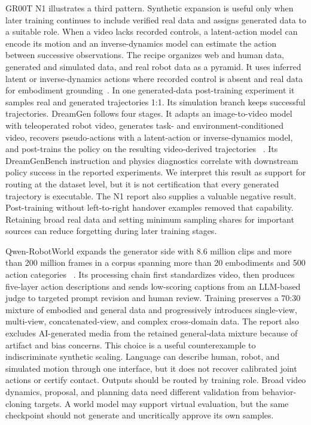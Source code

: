 GR00T N1 illustrates a third pattern.
Synthetic expansion is useful only when later training continues to include verified real data and assigns generated data to a suitable role.
When a video lacks recorded controls, a latent-action model can encode its motion and an inverse-dynamics model can estimate the action between successive observations.
The recipe organizes web and human data, generated and simulated data, and real robot data as a pyramid.
It uses inferred latent or inverse-dynamics actions where recorded control is absent and real data for embodiment grounding~\cite{nvidia2025gr00t_2503_14734}.
In one generated-data post-training experiment it samples real and generated trajectories 1:1.
Its simulation branch keeps successful trajectories.
DreamGen follows four stages.
It adapts an image-to-video model with teleoperated robot video, generates task- and environment-conditioned video, recovers pseudo-actions with a latent-action or inverse-dynamics model, and post-trains the policy on the resulting video-derived trajectories ~\cite{jang2025dreamgen_2505_12705}.
Its DreamGenBench instruction and physics diagnostics correlate with downstream policy success in the reported experiments.
We interpret this result as support for routing at the dataset level, but it is not certification that every generated trajectory is executable.
The N1 report also supplies a valuable negative result.
Post-training without left-to-right handover examples removed that capability.
Retaining broad real data and setting minimum sampling shares for important sources can reduce forgetting during later training stages.

Qwen-RobotWorld expands the generator side with 8.6 million clips and more than 200 million frames in a corpus spanning more than 20 embodiments and 500 action categories ~\cite{zhang2026qwen_2606_17030}.
Its processing chain first standardizes video, then produces five-layer action descriptions and sends low-scoring captions from an LLM-based judge to targeted prompt revision and human review.
Training preserves a 70:30 mixture of embodied and general data and progressively introduces single-view, multi-view, concatenated-view, and complex cross-domain data.
The report also excludes AI-generated media from the retained general-data mixture because of artifact and bias concerns.
This choice is a useful counterexample to indiscriminate synthetic scaling.
Language can describe human, robot, and simulated motion through one interface, but it does not recover calibrated joint actions or certify contact.
Outputs should be routed by training role.
Broad video dynamics, proposal, and planning data need different validation from behavior-cloning targets.
A world model may support virtual evaluation, but the same checkpoint should not generate and uncritically approve its own samples.

